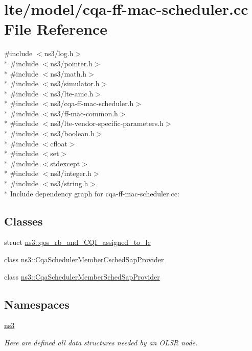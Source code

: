 \hypertarget{cqa-ff-mac-scheduler_8cc}{}\section{lte/model/cqa-\/ff-\/mac-\/scheduler.cc File Reference}
\label{cqa-ff-mac-scheduler_8cc}
{\ttfamily \#include $<$ns3/log.\+h$>$}\\*
{\ttfamily \#include $<$ns3/pointer.\+h$>$}\\*
{\ttfamily \#include $<$ns3/math.\+h$>$}\\*
{\ttfamily \#include $<$ns3/simulator.\+h$>$}\\*
{\ttfamily \#include $<$ns3/lte-\/amc.\+h$>$}\\*
{\ttfamily \#include $<$ns3/cqa-\/ff-\/mac-\/scheduler.\+h$>$}\\*
{\ttfamily \#include $<$ns3/ff-\/mac-\/common.\+h$>$}\\*
{\ttfamily \#include $<$ns3/lte-\/vendor-\/specific-\/parameters.\+h$>$}\\*
{\ttfamily \#include $<$ns3/boolean.\+h$>$}\\*
{\ttfamily \#include $<$cfloat$>$}\\*
{\ttfamily \#include $<$set$>$}\\*
{\ttfamily \#include $<$stdexcept$>$}\\*
{\ttfamily \#include $<$ns3/integer.\+h$>$}\\*
{\ttfamily \#include $<$ns3/string.\+h$>$}\\*
Include dependency graph for cqa-\/ff-\/mac-\/scheduler.cc\+:
\subsection*{Classes}
\begin{DoxyCompactItemize}
\item 
struct \hyperlink{structns3_1_1qos__rb__and__CQI__assigned__to__lc}{ns3\+::qos\+\_\+rb\+\_\+and\+\_\+\+C\+Q\+I\+\_\+assigned\+\_\+to\+\_\+lc}
\item 
class \hyperlink{classns3_1_1CqaSchedulerMemberCschedSapProvider}{ns3\+::\+Cqa\+Scheduler\+Member\+Csched\+Sap\+Provider}
\item 
class \hyperlink{classns3_1_1CqaSchedulerMemberSchedSapProvider}{ns3\+::\+Cqa\+Scheduler\+Member\+Sched\+Sap\+Provider}
\end{DoxyCompactItemize}
\subsection*{Namespaces}
\begin{DoxyCompactItemize}
\item 
 \hyperlink{namespacens3}{ns3}
\begin{DoxyCompactList}\small\item\em Here are defined all data structures needed by an O\+L\+SR node. \end{DoxyCompactList}\end{DoxyCompactItemize}
